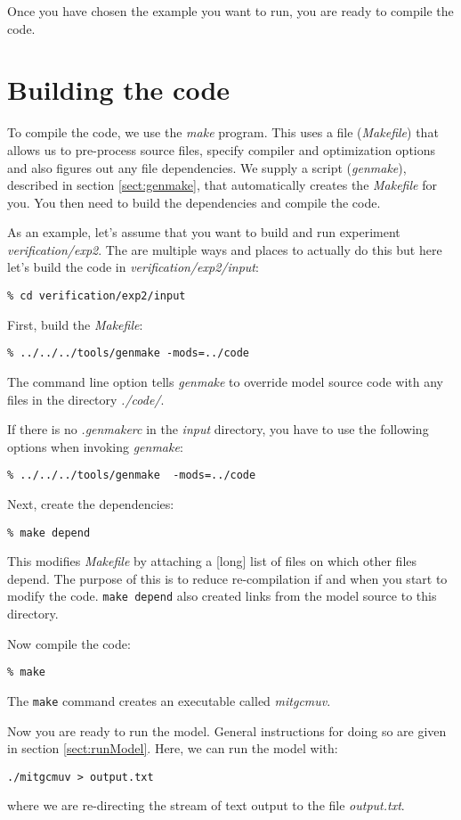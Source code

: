 Once you have chosen the example you want to run, you are ready to compile
the code.

\section{Building the code}
\label{sect:buildingCode}

To compile the code, we use the {\em make} program. This uses a file
({\em Makefile}) that allows us to pre-process source files, specify
compiler and optimization options and also figures out any file
dependencies. We supply a script ({\em genmake}), described in section
\ref{sect:genmake}, that automatically creates the {\em Makefile} for
you. You then need to build the dependencies and compile the code.

As an example, let's assume that you want to build and run experiment
\textit{verification/exp2}. The are multiple ways and places to actually
do this but here let's build the code in
\textit{verification/exp2/input}:
\begin{verbatim}
% cd verification/exp2/input
\end{verbatim}
First, build the {\em Makefile}:
\begin{verbatim}
% ../../../tools/genmake -mods=../code
\end{verbatim}
The command line option tells {\em genmake} to override model source
code with any files in the directory {\em ./code/}.

If there is no \textit{.genmakerc} in the \textit{input} directory, you have
to use the following options when invoking \textit{genmake}:
\begin{verbatim}
% ../../../tools/genmake  -mods=../code
\end{verbatim}

Next, create the dependencies:
\begin{verbatim}
% make depend
\end{verbatim}
This modifies {\em Makefile} by attaching a [long] list of files on
which other files depend. The purpose of this is to reduce
re-compilation if and when you start to modify the code. {\tt make
depend} also created links from the model source to this directory.

Now compile the code:
\begin{verbatim}
% make
\end{verbatim}
The {\tt make} command creates an executable called \textit{mitgcmuv}.

Now you are ready to run the model. General instructions for doing so are
given in section \ref{sect:runModel}. Here, we can run the model with:
\begin{verbatim}
./mitgcmuv > output.txt
\end{verbatim}
where we are re-directing the stream of text output to the file {\em
output.txt}.


